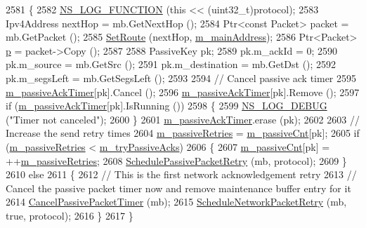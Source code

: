\begin{DoxyCode}
2581 \{
2582   \hyperlink{log-macros-disabled_8h_a90b90d5bad1f39cb1b64923ea94c0761}{NS\_LOG\_FUNCTION} (\textcolor{keyword}{this} << (uint32\_t)protocol);
2583   Ipv4Address nextHop = mb.GetNextHop ();
2584   Ptr<const Packet> packet = mb.GetPacket ();
2585   \hyperlink{classns3_1_1dsr_1_1DsrRouting_a8a726fb52558a1a8172a5bd5b8cdb072}{SetRoute} (nextHop, \hyperlink{classns3_1_1dsr_1_1DsrRouting_a73182b5edee2d8460f28855e058fc9a0}{m\_mainAddress});
2586   Ptr<Packet> \hyperlink{lte__link__budget_8m_ac9de518908a968428863f829398a4e62}{p} = packet->Copy ();
2587 
2588   PassiveKey pk;
2589   pk.m\_ackId = 0;
2590   pk.m\_source = mb.GetSrc ();
2591   pk.m\_destination = mb.GetDst ();
2592   pk.m\_segsLeft = mb.GetSegsLeft ();
2593 
2594   \textcolor{comment}{// Cancel passive ack timer}
2595   \hyperlink{classns3_1_1dsr_1_1DsrRouting_ac53c706898e76a7f4871a460d13edd36}{m\_passiveAckTimer}[pk].Cancel ();
2596   \hyperlink{classns3_1_1dsr_1_1DsrRouting_ac53c706898e76a7f4871a460d13edd36}{m\_passiveAckTimer}[pk].Remove ();
2597   \textcolor{keywordflow}{if} (\hyperlink{classns3_1_1dsr_1_1DsrRouting_ac53c706898e76a7f4871a460d13edd36}{m\_passiveAckTimer}[pk].IsRunning ())
2598     \{
2599       \hyperlink{group__logging_ga413f1886406d49f59a6a0a89b77b4d0a}{NS\_LOG\_DEBUG} (\textcolor{stringliteral}{"Timer not canceled"});
2600     \}
2601   \hyperlink{classns3_1_1dsr_1_1DsrRouting_ac53c706898e76a7f4871a460d13edd36}{m\_passiveAckTimer}.erase (pk);
2602 
2603   \textcolor{comment}{// Increase the send retry times}
2604   \hyperlink{classns3_1_1dsr_1_1DsrRouting_a88b8d65dce20b6b8f910be916623da0b}{m\_passiveRetries} = \hyperlink{classns3_1_1dsr_1_1DsrRouting_a7fec404d680459aab2b40941a950502d}{m\_passiveCnt}[pk];
2605   \textcolor{keywordflow}{if} (\hyperlink{classns3_1_1dsr_1_1DsrRouting_a88b8d65dce20b6b8f910be916623da0b}{m\_passiveRetries} < \hyperlink{classns3_1_1dsr_1_1DsrRouting_aadd1dd676ec50cae94ffd6f2eefb277c}{m\_tryPassiveAcks})
2606     \{
2607       \hyperlink{classns3_1_1dsr_1_1DsrRouting_a7fec404d680459aab2b40941a950502d}{m\_passiveCnt}[pk] = ++\hyperlink{classns3_1_1dsr_1_1DsrRouting_a88b8d65dce20b6b8f910be916623da0b}{m\_passiveRetries};
2608       \hyperlink{classns3_1_1dsr_1_1DsrRouting_abfdfa37822a492971fdf24540b635039}{SchedulePassivePacketRetry} (mb, protocol);
2609     \}
2610   \textcolor{keywordflow}{else}
2611     \{
2612       \textcolor{comment}{// This is the first network acknowledgement retry}
2613       \textcolor{comment}{// Cancel the passive packet timer now and remove maintenance buffer entry for it}
2614       \hyperlink{classns3_1_1dsr_1_1DsrRouting_aee6495417f54a12f484029ee1a445d64}{CancelPassivePacketTimer} (mb);
2615       \hyperlink{classns3_1_1dsr_1_1DsrRouting_a6a18c6baa374d5e6a68f8952d1afdb13}{ScheduleNetworkPacketRetry} (mb, \textcolor{keyword}{true}, protocol);
2616     \}
2617 \}
\end{DoxyCode}


